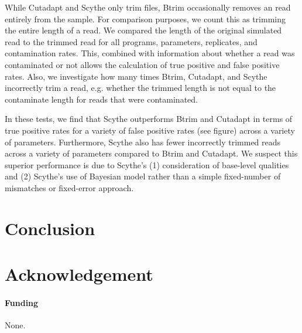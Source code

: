 \documentclass{bioinfo}
\begin{document}
\begin{methods}
While Cutadapt and Scythe only trim files, Btrim occasionally removes
an read entirely from the sample. For comparison purposes, we count
this as trimming the entire length of a read. We compared the length
of the original simulated read to the trimmed read for all programs,
parameters, replicates, and contamination rates. This, combined with
information about whether a read was contaminated or not allows the
calculation of true positive and false positive rates. Also, we
investigate how many times Btrim, Cutadapt, and Scythe incorrectly
trim a read, e.g. whether the trimmed length is not equal to the
contaminate length for reads that were contaminated.

In these tests, we find that Scythe outperforms Btrim and Cutadapt in
terms of true positive rates for a variety of false positive rates
(see figure) across a variety of parameters. Furthermore, Scythe also
has fewer incorrectly trimmed reads across a variety of parameters
compared to Btrim and Cutadapt. We suspect this superior performance
is due to Scythe's (1) consideration of base-level qualities and (2)
Scythe's use of Bayesian model rather than a simple fixed-number of
mismatches or fixed-error approach.

\end{methods}

\section{Conclusion}

\section*{Acknowledgement}

\paragraph{Funding\textcolon} None.



% 
% 
% 
% 


\end{document}
